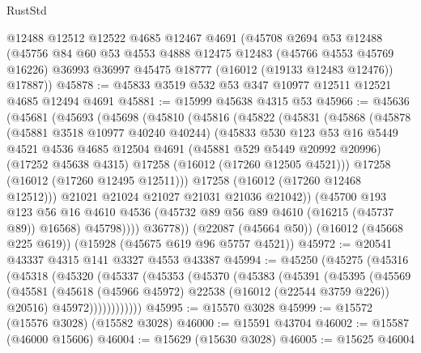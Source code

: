 \begin{lexlean}{RustStd}
\begin{coremodule}
    @12488
    @12512
    @12522
    @4685
    @12467
    @4691
    (@45708
      @2694
      @53
      @12488
      (@45756
        @84
        @60
        @53
        @4553
        @4888
        @12475
        @12483
        (@45766 @4553 @45769 @16226)
        @36993
        @36997
        @45475
        @18777
        (@16012 (@19133 @12483 @12476))
        @17887))
@45878 := @45833 @3519 @532 @53 @347 @10977 @12511 @12521 @4685 @12494 @4691
@45881 := @15999 @45638 @4315 @53
@45966 := @45636
    (@45681
      (@45693
        (@45698
          (@45810
            (@45816
              (@45822
                (@45831
                  (@45868
                    (@45878
                      (@45881 @3518 @10977 @40240 @40244)
                      (@45833
                        @530
                        @123
                        @53
                        @16
                        @5449
                        @4521
                        @4536
                        @4685
                        @12504
                        @4691
                        (@45881 @529 @5449 @20992 @20996)
                        (@17252 @45638 @4315)
                        @17258
                        (@16012 (@17260 @12505 @4521)))
                      @17258
                      (@16012 (@17260 @12495 @12511)))
                    @17258
                    (@16012 (@17260 @12468 @12512)))
                  @21021
                  @21024
                  @21027
                  @21031
                  @21036
                  @21042))
              (@45700
                @193
                @123
                @56
                @16
                @4610
                @4536
                (@45732 @89 @56 @89 @4610 (@16215 (@45737 @89)) @16568)
                @45798))))
        @36778))
    (@22087 (@45664 @50))
    (@16012 (@45668 @225 @619))
    (@15928 (@45675 @619 @96 @5757 @4521))
@45972 := @20541 @43337 @4315 @141 @3327 @4553 @43387
@45994 := @45250
    (@45275
      (@45316
        (@45318
          (@45320
            (@45337
              (@45353
                (@45370
                  (@45383
                    (@45391
                      (@45395
                        (@45569
                          (@45581
                            (@45618 (@45966 @45972) @22538 (@16012 (@22544 @3759 @226)) @20516)
                            @45972))))))))))))
@45995 := @15570 @3028
@45999 := @15572 (@15576 @3028) (@15582 @3028)
@46000 := @15591 @43704
@46002 := @15587 (@46000 @15606)
@46004 := @15629 (@15630 @3028)
@46005 := @15625 @46004

\end{coremodule}
\end{lexlean}
